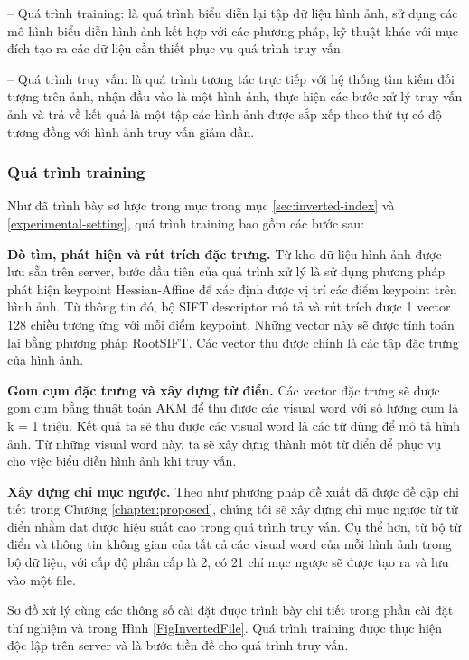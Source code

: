 -- Quá trình training: là quá trình biểu diễn lại tập dữ liệu hình ảnh, sử dụng các mô hình biểu diễn hình ảnh kết hợp với các phương pháp, kỹ thuật khác với mục đích tạo ra các dữ liệu cần thiết phục vụ quá trình truy vấn.

-- Quá trình truy vấn: là quá trình tương tác trực tiếp với hệ thống tìm kiếm đối tượng trên ảnh, nhận đầu vào là một hình ảnh, thực hiện các bước xử lý truy vấn ảnh và trả về kết quả là một tập các hình ảnh được sắp xếp theo thứ tự có độ tương đồng với hình ảnh truy vấn giảm dần.

\subsubsection{Quá trình training}
Như đã trình bày sơ lược trong mục trong mục \ref{sec:inverted-index} và \ref{experimental-setting}, quá trình training bao gồm các bước sau:

\textbf{Dò tìm, phát hiện và rút trích đặc trưng.} Từ kho dữ liệu hình ảnh được lưu sẵn trên server, bước đầu tiên của quá trình xử lý là sử dụng phương pháp phát hiện keypoint Hessian-Affine để xác định được vị trí các điểm keypoint trên hình ảnh. Từ thông tin đó, bộ SIFT descriptor mô tả và rút trích được 1 vector 128 chiều tương ứng với mỗi điểm keypoint. Những vector này sẽ được tính toán lại bằng phương pháp RootSIFT\cite{philbin2007object}. Các vector thu được chính là các tập đặc trưng của hình ảnh. 

\textbf{Gom cụm đặc trưng và xây dựng từ điển.} Các vector đặc trưng sẽ được gom cụm bằng thuật toán AKM để thu được các visual word với số lượng cụm là k = 1 triệu. Kết quả ta sẽ thu được các visual word là các từ dùng để mô tả hình ảnh. Từ những visual word này, ta sẽ xây dựng thành một từ điển để phục vụ cho việc biểu diễn hình ảnh khi truy vấn.

\textbf{Xây dựng chỉ mục ngược.} Theo như phương pháp đề xuất đã được đề cập chi tiết trong Chương \ref{chapter:proposed}, chúng tôi sẽ xây dựng chỉ mục ngược từ từ điển nhằm đạt được hiệu suất cao trong quá trình truy vấn. Cụ thể hơn, từ bộ từ điển và thông tin không gian của tất cả các visual word của mỗi hình ảnh trong bộ dữ liệu, với cấp độ phân cấp là 2, có 21 chỉ mục ngược sẽ được tạo ra và lưu vào một file.

Sơ đồ xử lý cùng các thông số cài đặt được trình bày chi tiết trong phần cài đặt thí nghiệm và trong Hình \ref{FigInvertedFile}. Quá trình training được thực hiện độc lập trên server và là bước tiền đề cho quá trình truy vấn.

